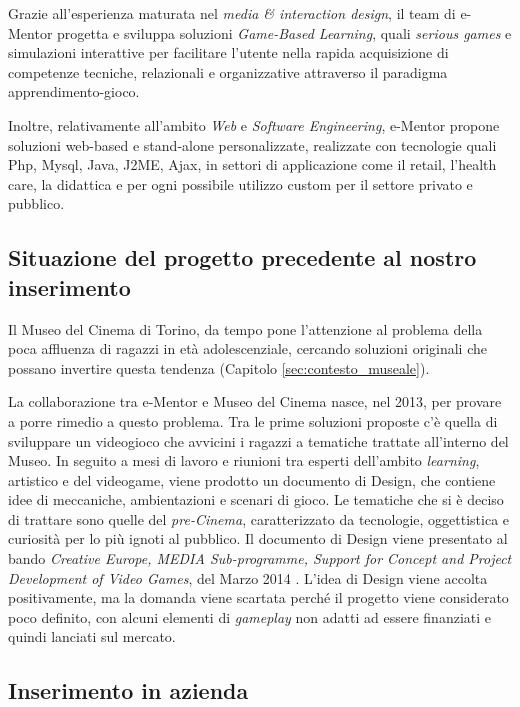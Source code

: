 Grazie all'esperienza maturata nel \textit{media \& interaction design}, il team di e-Mentor progetta e sviluppa soluzioni \textit{Game-Based Learning}, quali \textit{serious games} e simulazioni interattive per facilitare l'utente nella rapida acquisizione di competenze tecniche, relazionali e organizzative attraverso il paradigma apprendimento-gioco.

Inoltre, relativamente all’ambito \textit{Web} e \textit{Software Engineering}, e-Mentor propone soluzioni web-based e stand-alone personalizzate, realizzate con tecnologie quali Php, Mysql, Java, J2ME, Ajax, in settori di applicazione come il retail, l’health care, la didattica e per ogni possibile utilizzo custom per il settore privato e pubblico.

\subsection{Situazione del progetto precedente al nostro inserimento}
\label{sec:azienda_precedente}

Il Museo del Cinema di Torino, da tempo pone l’attenzione al problema della poca affluenza di ragazzi in età adolescenziale, cercando soluzioni originali che possano invertire questa tendenza (Capitolo \ref{sec:contesto_museale}).

La collaborazione tra e-Mentor e Museo del Cinema nasce, nel 2013, per provare a porre rimedio a questo problema.
Tra le prime soluzioni proposte c’è quella di sviluppare un videogioco che avvicini i ragazzi a tematiche trattate all’interno del Museo. In seguito a mesi di lavoro e riunioni tra esperti dell’ambito \textit{learning}, artistico e del videogame, viene prodotto un documento di Design, che contiene idee di meccaniche, ambientazioni e scenari di gioco. Le tematiche che si è deciso di trattare sono quelle del \textit{pre-Cinema}, caratterizzato da tecnologie, oggettistica e curiosità per lo più ignoti al pubblico.
Il documento di Design viene presentato al bando \textit{Creative Europe, MEDIA Sub-programme, Support for Concept and Project Development of Video Games}, del Marzo 2014 \cite{CreativeEurope}.
L’idea di Design viene accolta positivamente, ma la domanda viene scartata perché il progetto viene considerato poco definito, con alcuni elementi di \textit{gameplay} non adatti ad essere finanziati e quindi lanciati sul mercato.

\subsection{Inserimento in azienda}
\label{sec:azienda_inserimento}